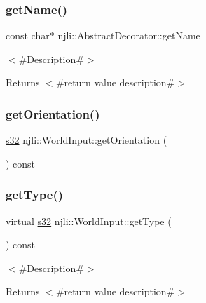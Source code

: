 \subsubsection{\texorpdfstring{get\+Name()}{getName()}}
{\footnotesize\ttfamily const char$\ast$ njli\+::\+Abstract\+Decorator\+::get\+Name}

$<$\#\+Description\#$>$

\begin{DoxyReturn}{Returns}
$<$\#return value description\#$>$ 
\end{DoxyReturn}
\mbox{\label{classnjli_1_1_world_input_a416f740cf8583f2d03a682a2ddce46b4}} 
\subsubsection{\texorpdfstring{get\+Orientation()}{getOrientation()}}
{\footnotesize\ttfamily \mbox{\hyperlink{_util_8h_aa62c75d314a0d1f37f79c4b73b2292e2}{s32}} njli\+::\+World\+Input\+::get\+Orientation (\begin{DoxyParamCaption}{ }\end{DoxyParamCaption}) const}

\mbox{\label{classnjli_1_1_world_input_ab2554a67aa2c53446395db34315a4d2a}} 
\subsubsection{\texorpdfstring{get\+Type()}{getType()}}
{\footnotesize\ttfamily virtual \mbox{\hyperlink{_util_8h_aa62c75d314a0d1f37f79c4b73b2292e2}{s32}} njli\+::\+World\+Input\+::get\+Type (\begin{DoxyParamCaption}{ }\end{DoxyParamCaption}) const\hspace{0.3cm}{\ttfamily [virtual]}}

$<$\#\+Description\#$>$

\begin{DoxyReturn}{Returns}
$<$\#return value description\#$>$ 
\end{DoxyReturn}


